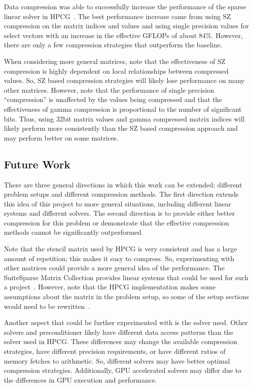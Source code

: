 Data compression was able to successfully increase the performance of the sparse linear solver in HPCG~\cite{Dongarra:2015:HPCG}.
The best performance increase came from using SZ compression on the matrix indices and values and using single precision values for select vectors with an increase in the effective GFLOPs of about 84\%.
However, there are only a few compression strategies that outperform the baseline.

When considering more general matrices, note that the effectiveness of SZ compression is highly dependent on local relationships between compressed values.
So, SZ based compression strategies will likely lose performance on many other matrices.
However, note that the performance of single precision ``compression'' is unaffected by the values being compressed and that the effectiveness of gamma compression is proportional to the number of significant bits.
Thus, using 32bit matrix values and gamma compressed matrix indices will likely perform more consistently than the SZ based compression approach and may perform better on some matrices.

\subsection{Future Work}
There are three general directions in which this work can be extended: different problem setups and different compression methods.
The first direction extends this idea of this project to more general situations, including different linear systems and different solvers.
The second direction is to provide either better compression for this problem or demonstrate that the effective compression methods cannot be significantly outperformed.

Note that the stencil matrix used by HPCG is very consistent and has a large amount of repetition; this makes it easy to compress.
So, experimenting with other matrices could provide a more general idea of the performance.
The SuiteSparse Matrix Collection provides linear systems that could be used for such a project~\cite{Davis:2011:FloridaMatrixCollection}.
However, note that the HPCG implementation makes some assumptions about the matrix in the problem setup, so some of the setup sections would need to be rewritten~\cite{Dongarra:2015:HPCG}.

Another aspect that could be further experimented with is the solver used.
Other solvers and preconditioner likely have different data access patterns than the solver used in HPCG.
These differences may change the available compression strategies, have different precision requirements, or have different ratios of memory fetches to arithmetic.
So, different solvers may have better optimal compression strategies.
Additionally, GPU accelerated solvers may differ due to the differences in GPU execution and performance.

